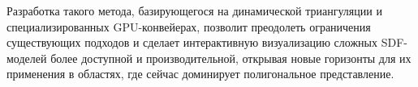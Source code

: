 Разработка такого метода, базирующегося на динамической триангуляции и специализированных GPU-конвейерах, позволит преодолеть ограничения существующих подходов и сделает интерактивную визуализацию сложных SDF-моделей более доступной и производительной, открывая новые горизонты для их применения в областях, где сейчас доминирует полигональное представление.